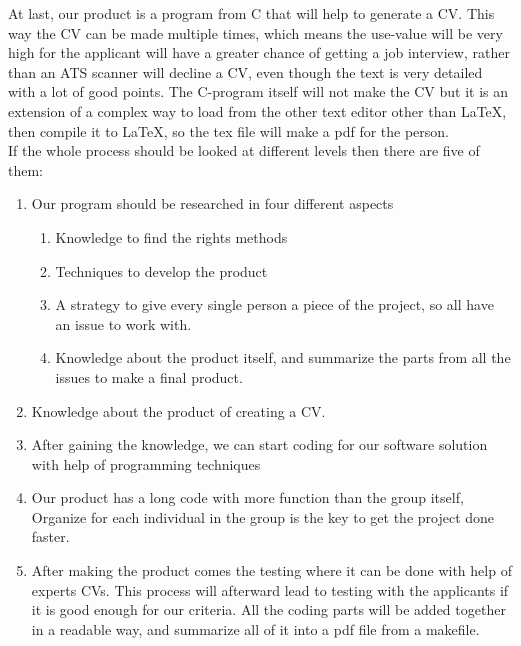 At last, our product is a program from C that will help to generate a CV. This way the CV can be made multiple times,
which means the use-value will be very high for the applicant will have a greater chance of getting a job interview,
rather than an ATS scanner will decline a CV, even though the text is very detailed with a lot of good points.
The C-program itself will not make the CV but it is an extension of a complex way to load from the other text editor
other than LaTeX, then compile it to LaTeX, so the tex file will make a pdf for the person.\\

If the whole process should be looked at different levels then there are five of them:

\begin{enumerate}
  \item Our program should be researched in four different aspects 
  \begin{enumerate}
    \item Knowledge to find the rights methods 
    \item Techniques to develop the product
    \item A strategy to give every single person a piece of the project, so all have an issue to work with.
    \item Knowledge about the product itself, and summarize the parts from all the issues to make a final product.
  \end{enumerate}
  \item Knowledge about the product of creating a CV.
  \item After gaining the knowledge,
        we can start coding for our software solution with help of programming techniques
  \item Our product has a long code with more function than the group itself, 
        Organize for each individual in the group is the key to get the project done faster.
  \item After making the product comes the testing where it can be done with help of experts CVs.
        This process will afterward lead to testing with the applicants if it is good enough for our criteria.
        All the coding parts will be added together in a readable way, and summarize all of it into a pdf file from a makefile.
\end{enumerate}